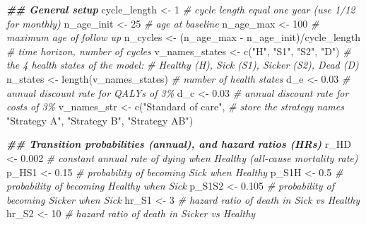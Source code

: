 \documentclass[
]{article}
\newenvironment{Shaded}{\begin{snugshade}}{\end{snugshade}}
\newcommand{\CommentTok}[1]{\textcolor[rgb]{0.56,0.35,0.01}{\textit{#1}}}
\newcommand{\DecValTok}[1]{\textcolor[rgb]{0.00,0.00,0.81}{#1}}
\newcommand{\DocumentationTok}[1]{\textcolor[rgb]{0.56,0.35,0.01}{\textbf{\textit{#1}}}}
\newcommand{\FloatTok}[1]{\textcolor[rgb]{0.00,0.00,0.81}{#1}}
\newcommand{\FunctionTok}[1]{\textcolor[rgb]{0.00,0.00,0.00}{#1}}
\newcommand{\NormalTok}[1]{#1}
\newcommand{\OtherTok}[1]{\textcolor[rgb]{0.56,0.35,0.01}{#1}}
\newcommand{\SpecialCharTok}[1]{\textcolor[rgb]{0.00,0.00,0.00}{#1}}
\newcommand{\StringTok}[1]{\textcolor[rgb]{0.31,0.60,0.02}{#1}}
\begin{document}
\begin{Shaded}
\begin{Highlighting}[]
\DocumentationTok{\#\# General setup}
\NormalTok{cycle\_length }\OtherTok{\textless{}{-}} \DecValTok{1} \CommentTok{\# cycle length equal one year (use 1/12 for monthly)}
\NormalTok{n\_age\_init }\OtherTok{\textless{}{-}} \DecValTok{25}  \CommentTok{\# age at baseline}
\NormalTok{n\_age\_max  }\OtherTok{\textless{}{-}} \DecValTok{100} \CommentTok{\# maximum age of follow up}
\NormalTok{n\_cycles }\OtherTok{\textless{}{-}}\NormalTok{ (n\_age\_max }\SpecialCharTok{{-}}\NormalTok{ n\_age\_init)}\SpecialCharTok{/}\NormalTok{cycle\_length }\CommentTok{\# time horizon, number of cycles}
\NormalTok{v\_names\_states }\OtherTok{\textless{}{-}} \FunctionTok{c}\NormalTok{(}\StringTok{"H"}\NormalTok{, }\StringTok{"S1"}\NormalTok{, }\StringTok{"S2"}\NormalTok{, }\StringTok{"D"}\NormalTok{) }\CommentTok{\# the 4 health states of the model:}
                               \CommentTok{\# Healthy (H), Sick (S1), Sicker (S2), Dead (D)}
\NormalTok{n\_states }\OtherTok{\textless{}{-}} \FunctionTok{length}\NormalTok{(v\_names\_states) }\CommentTok{\# number of health states }
\NormalTok{d\_e }\OtherTok{\textless{}{-}} \FloatTok{0.03} \CommentTok{\# annual discount rate for QALYs of 3\%}
\NormalTok{d\_c }\OtherTok{\textless{}{-}} \FloatTok{0.03} \CommentTok{\# annual discount rate for costs of 3\%}
\NormalTok{v\_names\_str }\OtherTok{\textless{}{-}} \FunctionTok{c}\NormalTok{(}\StringTok{"Standard of care"}\NormalTok{, }\CommentTok{\# store the strategy names}
                 \StringTok{"Strategy A"}\NormalTok{, }
                 \StringTok{"Strategy B"}\NormalTok{,}
                 \StringTok{"Strategy AB"}\NormalTok{) }

\DocumentationTok{\#\# Transition probabilities (annual), and hazard ratios (HRs)}
\NormalTok{r\_HD    }\OtherTok{\textless{}{-}} \FloatTok{0.002} \CommentTok{\# constant annual rate of dying when Healthy (all{-}cause mortality rate)}
\NormalTok{p\_HS1   }\OtherTok{\textless{}{-}} \FloatTok{0.15}  \CommentTok{\# probability of becoming Sick when Healthy}
\NormalTok{p\_S1H   }\OtherTok{\textless{}{-}} \FloatTok{0.5}   \CommentTok{\# probability of becoming Healthy when Sick}
\NormalTok{p\_S1S2  }\OtherTok{\textless{}{-}} \FloatTok{0.105} \CommentTok{\# probability of becoming Sicker when Sick}
\NormalTok{hr\_S1   }\OtherTok{\textless{}{-}} \DecValTok{3}     \CommentTok{\# hazard ratio of death in Sick vs Healthy}
\NormalTok{hr\_S2   }\OtherTok{\textless{}{-}} \DecValTok{10}    \CommentTok{\# hazard ratio of death in Sicker vs Healthy }


\end{Highlighting}
\end{Shaded}
\end{document}
